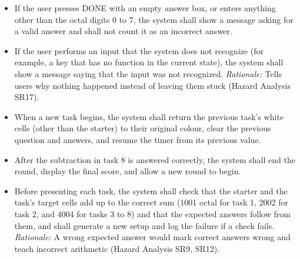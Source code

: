 \documentclass[12pt]{article}
\newcounter{reqnum} %
\begin{document}
\begin{itemize}
\item[FR\refstepcounter{reqnum}\thereqnum \label{FR_InputValidation}:] If the user presses DONE with an empty answer box, or enters anything other than the octal digits 0 to 7, the system shall show a message asking for a valid answer and shall not count it as an incorrect answer.
 
\item[FR\refstepcounter{reqnum}\thereqnum \label{FR_UnrecognizedInput}:] If the user performs an input that the system does not recognize (for example, a key that has no function in the current state), the system shall show a message saying that the input was not recognized. \newline \textit{Rationale:} Tells users why nothing happened instead of leaving them stuck (Hazard Analysis SR17).
 
\item[FR\refstepcounter{reqnum}\thereqnum \label{FR_NextTask}:] When a new task begins, the system shall return the previous task's white cells (other than the starter) to their original colour, clear the previous question and answers, and resume the timer from its previous value.
 
\item[FR\refstepcounter{reqnum}\thereqnum \label{FR_EndRound}:] After the subtraction in task 8 is answered correctly, the system shall end the round, display the final score, and allow a new round to begin.
 
\item[FR\refstepcounter{reqnum}\thereqnum \label{FR_VerifyTask}:] Before presenting each task, the system shall check that the starter and the task's target cells add up to the correct sum (1001 octal for task 1, 2002 for task 2, and 4004 for tasks 3 to 8) and that the expected answers follow from them, and shall generate a new setup and log the failure if a check fails. \newline \textit{Rationale:} A wrong expected answer would mark correct answers wrong and teach incorrect arithmetic (Hazard Analysis SR9, SR12).
 
\end{itemize}
 
\end{document}
